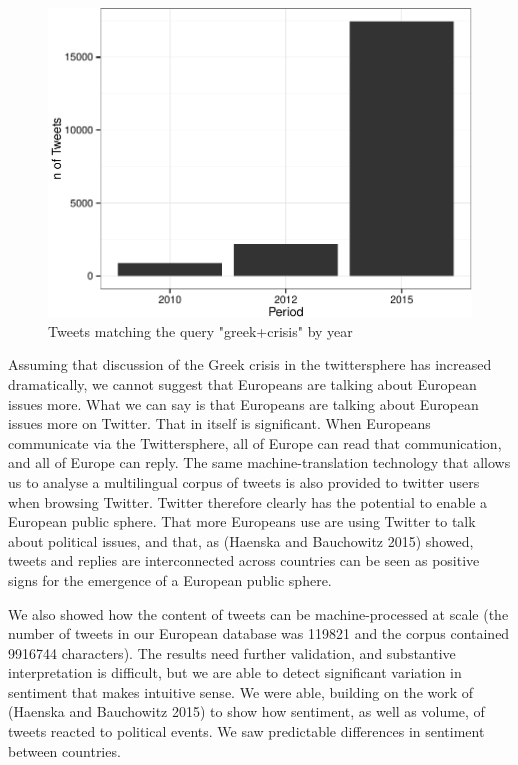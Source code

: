 \documentclass[]{article}
\begin{document}
\begin{figure}

{\centering \includegraphics{fin_paper_files/figure-latex/unnamed-chunk-19-1} 

}

\caption{Tweets matching the query "greek+crisis" by year}\label{fig:unnamed-chunk-19}
\end{figure}

Assuming that discussion of the Greek crisis in the twittersphere has
increased dramatically, we cannot suggest that Europeans are talking
about European issues more. What we can say is that Europeans are
talking about European issues more on Twitter. That in itself is
significant. When Europeans communicate via the Twittersphere, all of
Europe can read that communication, and all of Europe can reply. The
same machine-translation technology that allows us to analyse a
multilingual corpus of tweets is also provided to twitter users when
browsing Twitter. Twitter therefore clearly has the potential to enable
a European public sphere. That more Europeans use are using Twitter to
talk about political issues, and that, as (Haenska and Bauchowitz 2015)
showed, tweets and replies are interconnected across countries can be
seen as positive signs for the emergence of a European public sphere.

We also showed how the content of tweets can be machine-processed at
scale (the number of tweets in our European database was 119821 and the
corpus contained 9916744 characters). The results need further
validation, and substantive interpretation is difficult, but we are able
to detect significant variation in sentiment that makes intuitive sense.
We were able, building on the work of (Haenska and Bauchowitz 2015) to
show how sentiment, as well as volume, of tweets reacted to political
events. We saw predictable differences in sentiment between countries.
\end{document}
